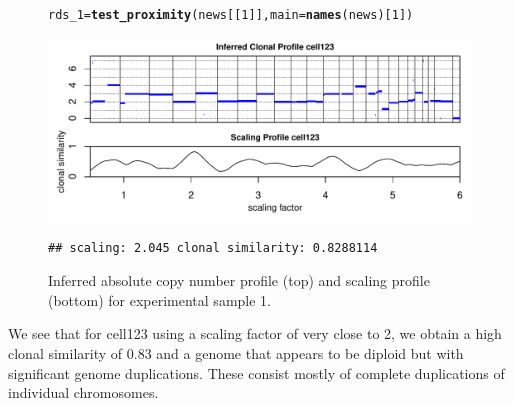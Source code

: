 \documentclass[12pt]{article}\usepackage[]{graphicx}\usepackage[]{color}
\makeatletter
\newcommand{\hlnum}[1]{\textcolor[rgb]{0.686,0.059,0.569}{#1}}%
\newcommand{\hlstd}[1]{\textcolor[rgb]{0.345,0.345,0.345}{#1}}%
\newcommand{\hlkwb}[1]{\textcolor[rgb]{0.69,0.353,0.396}{#1}}%
\newcommand{\hlkwc}[1]{\textcolor[rgb]{0.333,0.667,0.333}{#1}}%
\newcommand{\hlkwd}[1]{\textcolor[rgb]{0.737,0.353,0.396}{\textbf{#1}}}%
\newenvironment{kframe}{%
 \def\at@end@of@kframe{}%
 \ifinner\ifhmode%
  \def\at@end@of@kframe{\end{minipage}}%
  \begin{minipage}{\columnwidth}%
 \fi\fi%
 \def\FrameCommand##1{\hskip\@totalleftmargin \hskip-\fboxsep
 \colorbox{shadecolor}{##1}\hskip-\fboxsep
     \hskip-\linewidth \hskip-\@totalleftmargin \hskip\columnwidth}%
 \MakeFramed {\advance\hsize-\width
   \@totalleftmargin\z@ \linewidth\hsize
   \@setminipage}}%
 {\par\unskip\endMakeFramed%
 \at@end@of@kframe}
\newenvironment{knitrout}{}{} %
\makeatother
\begin{document}
\begin{figure}[h!]
  \centering
\begin{knitrout}
\color{fgcolor}\begin{kframe}
\begin{alltt}
\hlstd{rds_1} \hlkwb{=} \hlkwd{test_proximity}\hlstd{(news[[}\hlnum{1}\hlstd{]],} \hlkwc{main} \hlstd{=} \hlkwd{names}\hlstd{(news)[}\hlnum{1}\hlstd{])}
\end{alltt}
\end{kframe}
\includegraphics[width=.95\linewidth]{figure/unnamed-chunk-15-1} 
\begin{kframe}\begin{verbatim}
## scaling: 2.045 clonal similarity: 0.8288114
\end{verbatim}
\end{kframe}
\end{knitrout}
\caption{Inferred absolute copy number profile (top) and scaling profile (bottom) for experimental sample 1.}
\label{fig:samp1}
\end{figure}

We see that for cell123 using a scaling factor of very close to 2, we obtain a high clonal similarity of 0.83 and a genome that appears to be diploid but with significant genome duplications. These consist mostly of complete duplications of individual chromosomes.

\newpage
\end{document}

